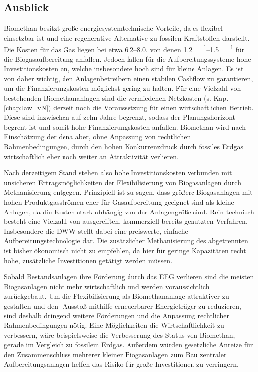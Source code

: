 \subsection{Ausblick}

Biomethan besitzt große energiesystemtechnische Vorteile, da es flexibel einsetzbar ist und eine regenerative Alternative zu fossilen Kraftstoffen darstellt. Die Kosten für das Gas liegen bei etwa \SIrange{6,2}{8,0}{\ctkwh}, von denen \SIrange{1,2}{1,5}{\ct\per\kwh} für die Biogasaufbereitung anfallen. Jedoch fallen für die Aufbereitungssysteme hohe Investitionskosten an, welche insbesondere hoch sind für kleine Anlagen. Es ist von daher wichtig, den Anlagenbetreibern einen stabilen Cashflow zu garantieren, um die Finanzierungskosten möglichst gering zu halten. Für eine Vielzahl von bestehenden Biomethananlagen sind die vermiedenen Netzkosten (s. Kap. \ref{chap:law_vN}) derzeit noch die Voraussetzung für einen wirtschaftlichen Betrieb. Diese sind inzwischen auf zehn Jahre begrenzt, sodass der Planungshorizont begrent ist und somit hohe Finanzierungskosten anfallen. Biomethan wird nach Einschätzung der dena aber, ohne Anpassung von rechtlichen Rahmenbedingungen, durch den hohen Konkurrenzdruck durch fossiles Erdgas wirtschaftlich eher noch weiter an Attraktivität verlieren.  \parencite{dena2018} \smallskip

Nach derzeitigem Stand stehen also hohe Investitionskosten verbunden mit unsicheren Ertragsmöglichkeiten der Flexibilisierung von Biogasanlagen durch Methanisierung entgegen. Prinzipiell ist zu sagen, dass größere Biogasanlagen mit hohen Produktgasströmen eher für Gasaufbereitung geeignet sind als kleine Anlagen, da die Kosten stark abhängig von der Anlagengröße sind. Rein technisch besteht eine Vielzahl von ausgereiften, kommerziell bereits genutzten Verfahren. Insbesondere die \gls{DWW} stellt dabei eine preiswerte, einfache Aufbereitungstechnologie dar. Die zusätzlicher Methanisierung des abgetrennten  ist bisher ökonomisch nicht zu empfehlen, da hier für geringe Kapazitäten recht hohe, zusätzliche Investitionen getätigt werden müssen. \smallskip

Sobald Bestandsanlagen ihre Förderung durch das \gls{EEG} verlieren sind die meisten Biogasanlagen nicht mehr wirtschaftlich und werden voraussichtlich zurückgebaut. Um die Flexibilisierung als Biomethananlage attraktiver zu gestalten und den -Ausstoß mithilfe erneuerbarer Energieträger zu reduzieren, sind deshalb dringend weitere Förderungen und die Anpassung rechtlicher Rahmenbedingungen nötig. Eine Möglichkeiten die Wirtschaftlichkeit zu verbessern, wäre beispielsweise die Verbesserung des Status von Biomethan, gerade im Vergleich zu fossilem Erdgas. Außerdem würden gesetzliche Anreize für den Zusammenschluss mehrerer kleiner Biogasanlagen zum Bau zentraler Aufbereitungsanlagen helfen das Risiko für große Investitionen zu verringern. \parencite{UmBA19}